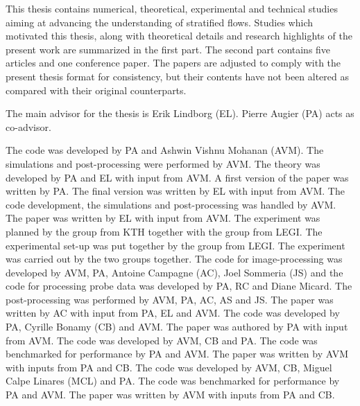 %
\begin{preface}
    This thesis contains numerical, theoretical, experimental and
    technical studies aiming at advancing the understanding of stratified flows.
    Studies which motivated this thesis, along with theoretical
    details and research highlights of the present work are summarized in the
    first part. The second part contains five articles and one conference
    paper.
    The papers are adjusted to comply with the present thesis format for
    consistency, but their contents have not been altered as compared with their
    original counterparts.
\end{preface}


%
\begin{divisionofwork}
	The main advisor for the thesis is Erik Lindborg (EL).
    Pierre Augier (PA) acts as co-advisor.

	\paperitem
        The code was developed by PA and Ashwin Vishnu
        Mohanan (AVM). The simulations and post-processing were performed
        by AVM. The theory was developed by PA and EL with input from AVM. A
        first version of the paper was written by PA. The final version was
        written by EL with input from AVM.
	\paperitem
        The code development, the simulations and post-processing was
        handled by AVM. The paper was written by EL with input from
        AVM.
    \paperitem
        The experiment was planned by the group from KTH together with the group from
        LEGI. The experimental set-up was put together by
        the group from LEGI. The experiment was carried out by the two groups
        together.
        The code for image-processing was developed by AVM, PA, Antoine
        Campagne (AC), Joel Sommeria (JS) and the code for processing
        probe data was developed by PA, RC and Diane Micard. The
        post-processing was performed by AVM, PA, AC, AS and JS.
        The paper was written by AC with input from PA, EL and AVM.
    \paperitem
        The code was developed by PA, Cyrille Bonamy (CB) and AVM. The paper
        was authored by PA with input from AVM.
    \paperitem
        The code was developed by AVM, CB and PA.
        The code was benchmarked for performance by PA and AVM.
        The paper was written by AVM with inputs from PA and CB.
    \paperitem
        The code was developed by AVM, CB, Miguel Calpe Linares (MCL) and PA.
        The code was benchmarked for performance by PA and AVM.
        The paper was written by AVM with inputs from PA and CB.

\end{divisionofwork}


